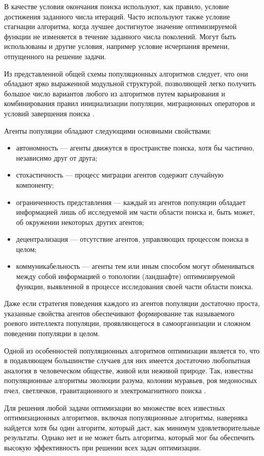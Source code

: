 В качестве условия окончания поиска используют, как правило, условие достижения заданного числа итераций. Часто используют также условие стагнации алгоритма, когда лучшее достигнутое значение оптимизируемой функции не изменяется в течение заданного числа поколений. Могут быть использованы и другие условия, например условие исчерпания времени, отпущенного на решение задачи. 

Из представленной общей схемы популяционных алгоритмов следует, что они обладают ярко выраженной модульной структурой, позволяющей легко получить большое число вариантов любого из алгоритмов путем варьирования и комбинирования правил инициализации популяции, миграционных операторов и условий завершения поиска \cite{dervis}.

Агенты популяции обладают следующими основными свойствами:
\begin{itemize}
	\item автономность --- агенты движутся в пространстве поиска, хотя бы частично, независимо друг от друга;
	\item стохастичность --- процесс миграции агентов содержит случайную компоненту;
	\item ограниченность представления --- каждый из агентов популяции обладает информацией лишь об исследуемой им части области поиска и, быть может, об окружении некоторых других агентов;
	\item децентрализация --- отсутствие агентов, управляющих процессом поиска в целом;
	\item коммуникабельность --- агенты тем или иным способом могут обмениваться между собой информацией о топологии (ландшафте) \cite{yang} оптимизируемой функции, выявленной в процессе исследования своей части области поиска. 
\end{itemize}

Даже если стратегия поведения каждого из агентов популяции достаточно проста, указанные свойства агентов обеспечивают формирование так называемого роевого интеллекта популяции, проявляющегося в самоорганизации и сложном поведении популяции в целом.  

Одной из особенностей популяционных алгоритмов оптимизации является то, что в подавляющем большинстве случаев для них имеется достаточно любопытная аналогия в человеческом обществе, живой или неживой природе. Так, известны популяционные алгоритмы эволюции разума, колонии муравьев, роя медоносных пчел, светлячков, гравитационного и электромагнитного поиска \cite{kur}.


Для решения любой задачи оптимизации во множестве всех известных оптимизационных алгоритмов, включая популяционные алгоритмы, наверняка найдется хотя бы один алгоритм, который даст, как минимум удовлетворительные результаты. Однако нет и не может быть алгоритма, который мог бы обеспечить высокую эффективность при решении всех задач оптимизации.


